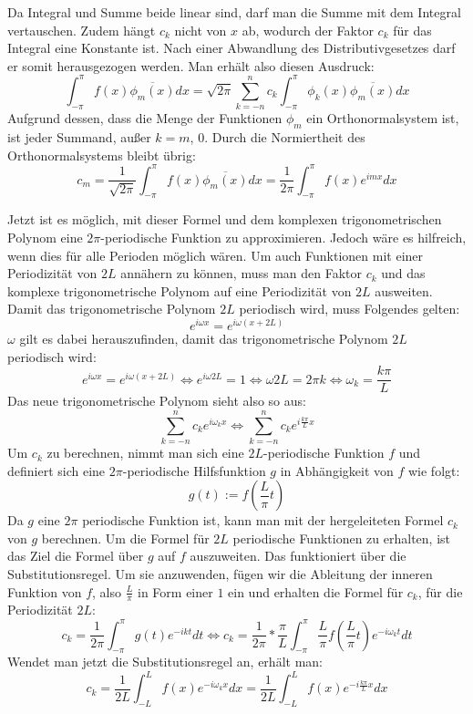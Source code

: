 \documentclass[a4paper,12pt]{article}
\theoremstyle{definition}
\theoremstyle{remark}
\begin{document}
Da Integral und Summe beide linear sind, darf man die Summe mit dem Integral vertauschen. 
Zudem hängt $c_k$ nicht von $x$ ab, wodurch der Faktor $c_k$ für das Integral eine Konstante ist. 
Nach einer Abwandlung des Distributivgesetzes darf er somit herausgezogen werden. Man erhält 
also diesen Ausdruck: 
$$\int_{-\pi}^\pi{f(x)\overline{\phi_m(x)} dx} = \sqrt{2\pi}\sum_{k=-n}^{n}{c_k\int_{-\pi}^\pi{\phi_k(x) \overline{\phi_m(x)} dx}}$$
Aufgrund dessen, dass die Menge der Funktionen $\phi_m$ ein Orthonormalsystem ist, ist jeder Summand, außer $k = m$, 0. Durch die Normiertheit des Orthonormalsystems bleibt übrig:
$$c_m = \frac{1}{\sqrt{2\pi}}\int_{-\pi}^\pi{f(x)\overline{\phi_m(x)}dx} = \frac{1}{2\pi}\int_{-\pi}^\pi{f(x)e^{imx}dx}$$ 

Jetzt ist es möglich, mit dieser Formel und dem komplexen trigonometrischen Polynom eine 
$2\pi$-periodische Funktion zu approximieren. Jedoch wäre es hilfreich, wenn dies für alle 
Perioden möglich wären. Um auch Funktionen mit einer Periodizität von $2L$ annähern zu können, 
muss man den Faktor $c_k$ und das komplexe trigonometrische Polynom auf eine Periodizität von $2L$ ausweiten. 
Damit das trigonometrische Polynom $2L$ periodisch wird, muss Folgendes gelten: 
$$e^{i\omega x} = e^{i\omega(x+2L)}$$
$\omega$ gilt es dabei herauszufinden, damit das trigonometrische Polynom $2L$ periodisch wird:
$$e^{i\omega x} = e^{i\omega(x+2L)} \Leftrightarrow e^{i\omega 2L} = 1 \Leftrightarrow \omega 2L = 2\pi k \Leftrightarrow \omega_k = \frac{k\pi}{L}$$
Das neue trigonometrische Polynom sieht also so aus:
$$\sum_{k=-n}^n{c_k e^{i\omega_kx}} \Leftrightarrow \sum_{k=-n}^n{c_k e^{i\frac{k\pi}{L}x}}$$
Um $c_k$ zu berechnen, nimmt man sich eine $2L$-periodische Funktion $f$ und definiert sich eine $2\pi$-periodische 
Hilfsfunktion $g$ in Abhängigkeit von $f$ wie folgt:
$$g(t) := f\left(\frac{L}{\pi}t\right) $$
Da $g$ eine $2\pi$ periodische Funktion ist, kann man mit der hergeleiteten Formel $c_k$ 
von $g$ berechnen. Um die Formel für $2L$ periodische Funktionen zu erhalten, ist das 
Ziel die Formel über $g$ auf $f$ auszuweiten. Das funktioniert über die Substitutionsregel. Um sie anzuwenden, fügen wir die Ableitung der inneren Funktion von $f$, 
also $\frac{L}{\pi}$ in Form einer $1$ ein und erhalten die Formel für $c_k$, für die 
Periodizität $2L$: 
$$c_k = \frac{1}{2\pi} \int_{-\pi}^\pi{g(t)e^{-ikt}dt} \Leftrightarrow c_k = \frac{1}{2\pi}*\frac{\pi}{L} \int_{-\pi}^{\pi}{\frac{L}{\pi}f\left(\frac{L}{\pi}t\right)e^{-i\omega_kt} dt}$$
Wendet man jetzt die Substitutionsregel an, erhält man: 
$$c_k = \frac{1}{2L}\int_{-L}^{L}{f(x)e^{-i\omega_kx}dx} = \frac{1}{2L}\int_{-L}^{L}{f(x)e^{-i\frac{k\pi}{L}x}dx}$$
\end{document}
